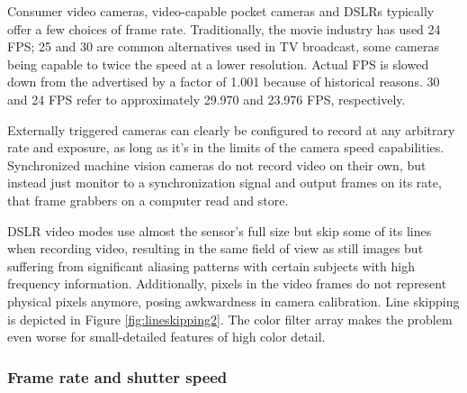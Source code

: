 
Consumer video cameras, video-capable pocket cameras and DSLRs typically offer a few choices of frame rate. Traditionally, the movie industry has used 24 FPS; 25 and 30 are common alternatives used in TV broadcast, some cameras being capable to twice the speed at a lower resolution.
Actual FPS is slowed down from the advertised by a factor of 1.001 because of historical reasons. %
30 and 24 FPS refer to approximately 29.970 and 23.976 FPS, respectively.
\cite{musburger2010single}

Externally triggered cameras can clearly be configured to record at any arbitrary rate and exposure, as long as it's in the limits of the camera speed capabilities.
Synchronized machine vision cameras do not record video on their own, but instead just monitor to a synchronization signal and output frames on its rate, that frame grabbers on a computer read and store.
\cite{hornberg2007handbook}


DSLR video modes use almost the sensor's full size but skip some of its lines when recording video, resulting in the same field of view as still images but suffering from significant aliasing patterns with certain subjects with high frequency information.
Additionally, pixels in the video frames do not represent physical pixels anymore, posing awkwardness in camera calibration.
Line skipping is depicted in Figure \ref{fig:lineskipping2}.
The color filter array makes the problem even worse for small-detailed features of high color detail.



\subsubsection{Frame rate and shutter speed} %


